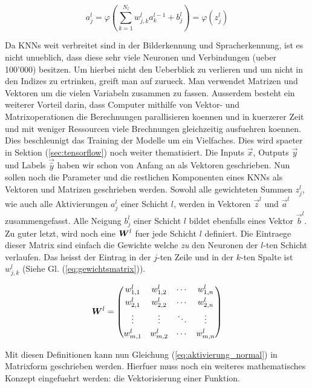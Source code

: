 \documentclass[../main]{subfiles}
\begin{document}
\begin{equation}\label{eq:aktivierung_normal}
  a_j^l = \varphi\left(\sum_{k=1}^{N_l} w_{j,k}^l a_k^{l-1} + b_j^l \right) = \varphi \left( z_j^l \right)
\end{equation}
\par\bigskip
Da KNNs weit verbreitet sind in der Bilderkennung und Spracherkennung, ist es
nicht unueblich, dass diese sehr viele Neuronen und Verbindungen (ueber 100'000) besitzen.
Um hierbei nicht den Ueberblick zu verlieren und um nicht in den Indizes zu
ertrinken, greift man auf  zurueck. Man verwendet
Matrizen und Vektoren um die vielen Variabeln zusammen zu fassen.
Ausserdem besteht ein weiterer Vorteil darin, dass Computer mithilfe von Vektor-
und Matrixoperationen die Berechnungen parallisieren koennen und in kuerzerer
Zeit und mit weniger Ressourcen viele Brechnungen gleichzeitig ausfuehren koennen.
Dies beschleunigt das Training der Modelle um
ein Vielfaches. Dies wird spaeter in Sektion
(\ref{sec:tensorflow}) noch weiter thematisiert.
\para{}
Die Inputs $\vec{x}$, Outputs $\vec{y}$ und Labels $\vec{\hat{y}}$ haben wir schon von Anfang an als Vektoren geschrieben.
Nun sollen noch die Parameter und die restlichen Komponenten eines KNNs als Vektoren und Matrizen geschrieben werden.
Sowohl alle gewichteten Summen $z_j^l$, wie auch alle Aktivierungen $a_j^l$
einer Schicht $l$, werden in Vektoren $\vec{z}^l$ und $\vec{a}^l$ zusammengefasst.
Alle Neigung $b_j^l$ einer Schicht $l$ bildet ebenfalls eines Vektor $\vec{b}^l$.
Zu guter letzt, wird noch eine  $\bm{W}^l$ fuer jede
Schicht $l$ definiert.
Die Eintraege dieser Matrix sind einfach die Gewichte welche \textit{zu} den Neuronen der
$l$-ten Schicht verlaufen. Das heisst der Eintrag in der $j$-ten Zeile und in
der $k$-ten Spalte ist $w_{j,k}^l$ (Siehe Gl. (\ref{eq:gewichtsmatrix})).

\begin{equation}\label{eq:gewichtsmatrix}
  \bm{W}^l =
  \begin{pmatrix}
    w_{1,1}^l & w_{1,2}^l & \cdots & w_{1,n}^l \\[0.3em]
    w_{2,1}^l & w_{2,2}^l & \cdots & w_{2,n}^l \\[0.3em]
    \vdots & \vdots & \ddots & \vdots \\[0.3em]
    w_{m,1}^l & w_{m,2}^l & \cdots & w_{m,n}^l
  \end{pmatrix}
\end{equation}

Mit diesen Definitionen kann nun Gleichung (\ref{eq:aktivierung_normal}) in
Matrixform geschrieben werden. Hierfuer muss noch ein weiteres mathematisches
Konzept eingefuehrt werden: die Vektorisierung einer Funktion.
\para{}
\end{document}
